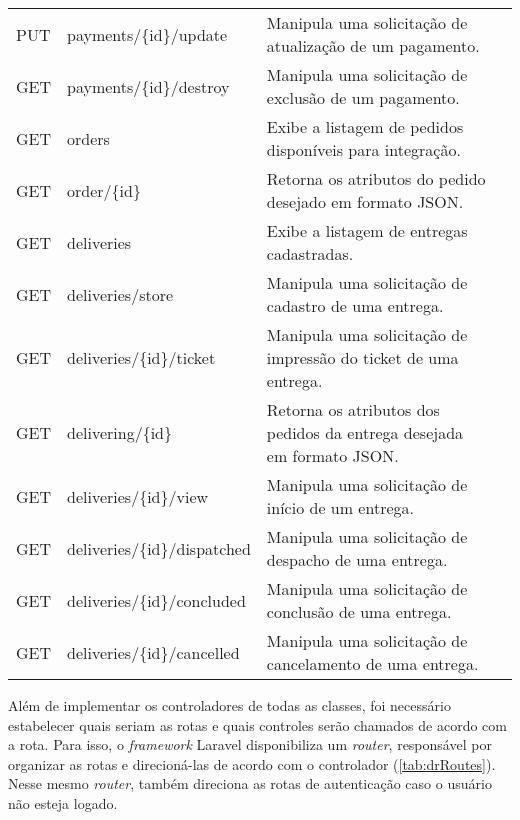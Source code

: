 \begin{table}[H]
\begin{tabular}{llp{9.2cm}l}
PUT & payments/\{id\}/update & Manipula uma solicitação de atualização de um pagamento. \\
GET & payments/\{id\}/destroy & Manipula uma solicitação de exclusão de um pagamento. \\
GET & orders & Exibe a listagem de pedidos disponíveis para integração. \\
GET & order/\{id\} & Retorna os atributos do pedido desejado em formato JSON. \\
GET & deliveries & Exibe a listagem de entregas cadastradas. \\
GET & deliveries/store & Manipula uma solicitação de cadastro de uma entrega. \\
GET & deliveries/\{id\}/ticket & Manipula uma solicitação de impressão do ticket de uma entrega. \\
GET & delivering/\{id\} & Retorna os atributos dos pedidos da entrega desejada em formato JSON. \\
GET & deliveries/\{id\}/view & Manipula uma solicitação de início de um entrega. \\
GET & deliveries/\{id\}/dispatched & Manipula uma solicitação de despacho de uma entrega. \\
GET & deliveries/\{id\}/concluded & Manipula uma solicitação de conclusão de uma entrega. \\
GET & deliveries/\{id\}/cancelled & Manipula uma solicitação de cancelamento de uma entrega. \\
\bottomrule
\end{tabular}
\end{table}

\newpage
Além de implementar os controladores de todas as classes, foi necessário estabelecer quais seriam as rotas e quais controles serão chamados de acordo com a rota. Para isso, o \textit{framework} Laravel disponibiliza um \textit{router}, responsável por organizar as rotas e direcioná-las de acordo com o controlador (\autoref{tab:drRoutes}). Nesse mesmo \textit{router}, também direciona as rotas de autenticação caso o usuário não esteja logado.